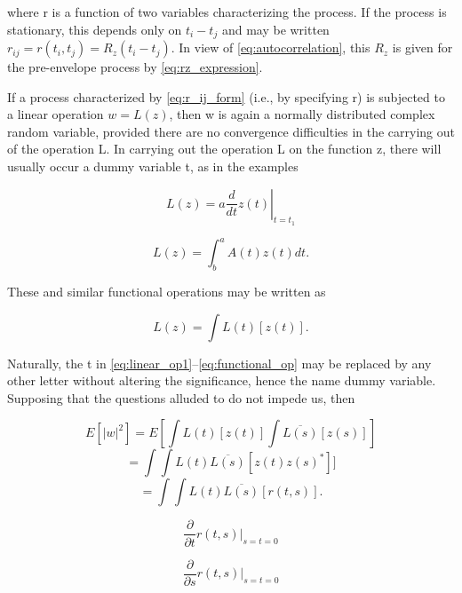 \documentclass[10pt,twocolumn]{article}
\theoremstyle{definition}
\begin{document}
where r is a function of two variables characterizing the process. If the process is stationary, this depends only on $t_i - t_j$ and may be written $r_{ij} = r(t_i, t_j) = R_z(t_i - t_j)$. In view of \eqref{eq:autocorrelation}, this $R_z$ is given for the pre-envelope process by \eqref{eq:rz_expression}.

If a process characterized by \eqref{eq:r_ij_form} (i.e., by specifying r) is subjected to a linear operation $w = L(z)$, then w is again a normally distributed complex random variable, provided there are no convergence difficulties in the carrying out of the operation L. In carrying out the operation L on the function z, there will usually occur a dummy variable t, as in the examples

\begin{equation}
\label{eq:linear_op1}
L(z) = a \left.\frac{d}{dt} z(t)\right|_{t=t_1}
\end{equation}

\begin{equation}
\label{eq:linear_op2}
L(z) = \int_b^a A(t)z(t) dt.
\end{equation}

These and similar functional operations may be written as

\begin{equation}
\label{eq:functional_op}
L(z) = \int L(t) [z(t)].
\end{equation}

Naturally, the t in \eqref{eq:linear_op1}--\eqref{eq:functional_op} may be replaced by any other letter without altering the significance, hence the name dummy variable. Supposing that the questions alluded to do not impede us, then

\begin{equation}
\label{eq:expected_w_squared}
E[|w|^2] = E\left[\int L(t) [z(t)]\int \overline{L(s)} [z(s)]\right]
\end{equation}
\begin{equation}
= \int\int L(t)\overline{L(s)} [z(t)z(s)^*]]
\end{equation}
\begin{equation}
= \int\int L(t)\overline{L(s)} [r(t, s)].
\end{equation}

\begin{equation}
\frac{\partial}{\partial t} r(t, s)\big|_{s=t=0}
\end{equation}

\begin{equation}
\frac{\partial}{\partial s} r(t, s)\big|_{s=t=0}
\end{equation}
\end{document}
